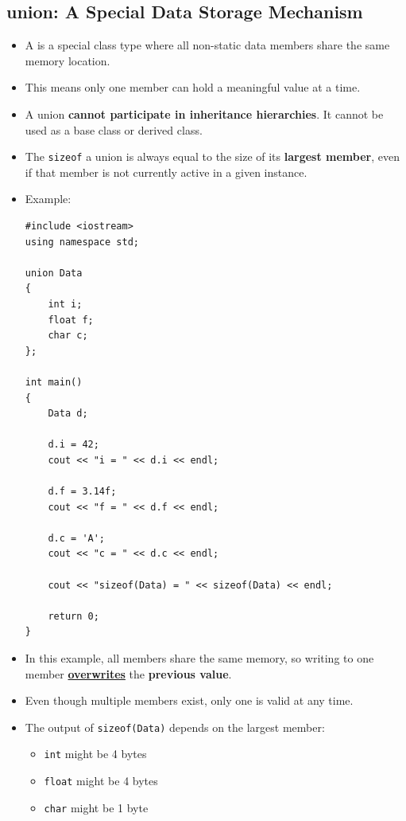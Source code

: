 \documentclass[10pt]{article}
\newcommand{\vocab}[1]{\fbox{\textbf{\textit{#1}}}}
\begin{document}
\subsection{union: A Special Data Storage Mechanism}
\begin{itemize}
    \item A \vocab{union} is a special class type where all non-static data members
    share the same memory location.

    \item This means only one member can hold a meaningful value at a time.

    \item A union \textbf{cannot participate in inheritance hierarchies}. It cannot
    be used as a base class or derived class.

    \item The \verb|sizeof| a union is always equal to the size of its \textbf{largest member},
    even if that member is not currently active in a given instance.

    \item Example:

\begin{verbatim}
#include <iostream>
using namespace std;

union Data
{
    int i;
    float f;
    char c;
};

int main()
{
    Data d;

    d.i = 42;
    cout << "i = " << d.i << endl;

    d.f = 3.14f;
    cout << "f = " << d.f << endl;

    d.c = 'A';
    cout << "c = " << d.c << endl;

    cout << "sizeof(Data) = " << sizeof(Data) << endl;

    return 0;
}
\end{verbatim}

    \item In this example, all members share the same memory, so writing to one
		member \textbf{\underline{overwrites}} the \textbf{previous value}.

    \item Even though multiple members exist, only one is valid at any time.

    \item The output of \verb|sizeof(Data)| depends on the largest member:
    \begin{itemize}
        \item \verb|int| might be 4 bytes
        \item \verb|float| might be 4 bytes
        \item \verb|char| might be 1 byte
    \end{itemize}


\end{itemize}
\end{document}
